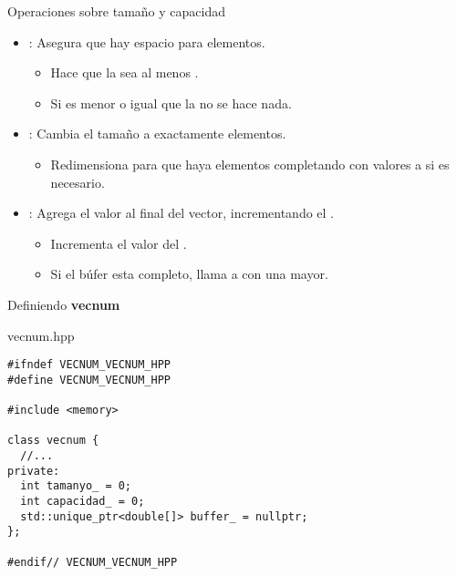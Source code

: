 \begin{frame}[t]{Operaciones sobre tamaño y capacidad}
\begin{itemize}
  \item {}: Asegura que hay espacio para  elementos.
    \begin{itemize}
      \item Hace que la  sea al menos .
      \item Si  es menor o igual que la  no se hace nada.
    \end{itemize}

  \item {}: Cambia el tamaño a exactamente  elementos.
    \begin{itemize}
      \item Redimensiona para que haya  elementos completando con
            valores a  si es necesario.
    \end{itemize}

  \item {}: Agrega el valor  al final del vector,
        incrementando el . 
    \begin{itemize}
      \item Incrementa el valor del .
      \item Si el búfer esta completo, llama a  con una
             mayor.
    \end{itemize}
\end{itemize}
\end{frame}

\begin{frame}[t,fragile]{Definiendo \textbf{vecnum}}
\begin{block}{vecnum.hpp}
\begin{lstlisting}
#ifndef VECNUM_VECNUM_HPP
#define VECNUM_VECNUM_HPP

#include <memory>

class vecnum {
  //...
private:
  int tamanyo_ = 0;
  int capacidad_ = 0;
  std::unique_ptr<double[]> buffer_ = nullptr;
};

#endif// VECNUM_VECNUM_HPP
\end{lstlisting}
\end{block}
\end{frame}

